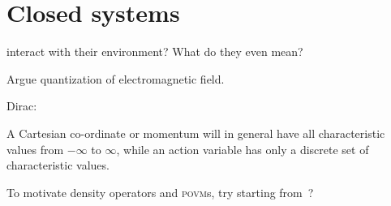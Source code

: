 \documentclass[../thesis.tex]{subfiles}
\begin{document}
\chapter{Closed systems}

 interact with their environment? What do they even
mean?

Argue quantization of electromagnetic field.

Dirac:~\cite[p.~246]{diracQuantumTheoryEmission1927}
\begin{displayquote}
  A Cartesian co-ordinate or momentum will in general have all characteristic
  values from $-\infty$ to $\infty$, while an action variable has only a
  discrete set of characteristic values.
\end{displayquote}

To motivate density operators and \textsc{povm}s, try starting
from~\cite{hardyQuantumTheoryFive2001}?
\end{document}
